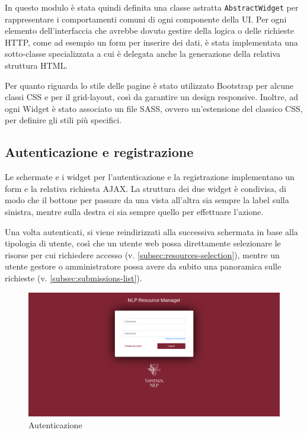 In questo modulo è stata quindi definita una classe astratta \texttt{AbstractWidget}
per rappresentare i comportamenti comuni di ogni componente della UI. Per ogni elemento
dell'interfaccia che avrebbe dovuto gestire della logica o delle richieste HTTP,
come ad esempio un form per inserire dei dati, è stata implementata una sotto-classe
specializzata a cui è delegata anche la generazione della relativa struttura HTML.

Per quanto riguarda lo stile delle pagine è stato utilizzato Bootstrap per alcune
classi CSS e per il grid-layout, così da garantire un design responsive. Inoltre,
ad ogni Widget è stato associato un file SASS, ovvero un'estensione del classico
CSS, per definire gli stili più specifici.


\subsection{Autenticazione e registrazione}
Le schermate e i widget per l'autenticazione e la registrazione implementano un
form e la relativa richiesta AJAX. La struttura dei due widget è condivisa, di
modo che il bottone per passare da una vista all'altra sia sempre la label sulla
sinistra, mentre sulla destra ci sia sempre quello per effettuare l'azione.

Una volta autenticati, si viene reindirizzati alla successiva schermata in base
alla tipologia di utente, così che un utente web possa direttamente selezionare
le risorse per cui richiedere accesso (v. \autoref{subsec:resources-selection}),
mentre un utente gestore o amministratore possa avere da subito una panoramica
sulle richieste (v. \autoref{subsec:submissions-list}).

\begin{figure}[H]
	\centering
	\includegraphics[width=\textwidth]{assets/ui/login.png}
	\caption{Autenticazione}
	\label{fig:login}
\end{figure}

